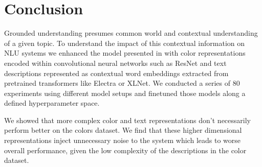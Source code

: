 \section{Conclusion}

Grounded understanding presumes common world and contextual understanding of a given topic. To understand the impact of this contextual information on NLU systems we enhanced the model presented in \citep{monroe-2017-colors} with color representations encoded within convolutional neural networks such as ResNet and text descriptions represented as contextual word embeddings extracted from pretrained transformers like Electra or XLNet. We conducted a series of 80 experiments using different model setups and finetuned those models along a defined hyperparameter space.

\par
We showed that more complex color and text representations don’t necessarily perform better on the colors dataset. We find that these higher dimensional representations inject unnecessary noise to the system which leads to worse overall performance, given the low complexity of the descriptions in the color dataset.

